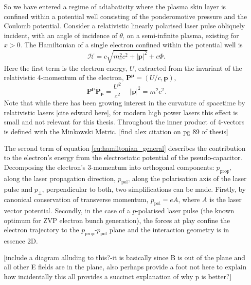 So we have entered a regime of adiabaticity where the plasma skin layer is confined within a potential well consisting of the ponderomotive pressure and the Coulomb potential. Consider a relativistic linearly polarised laser pulse obliquely incident, with an angle of incidence of $\theta$, on a semi-infinite plasma, existing for $x>0$. The Hamiltonian of a single electron confined within the potential well is
\begin{equation}\label{eq:hamiltonian_general}
	\mathcal{H} = c\sqrt{m^2_ec^2 + |\mathbf{p}|^2} + e\Phi.
\end{equation}
Here the first term is the electron energy, $U$, extracted from the invariant of the relativistic 4-momentum of the electron, $\mathbf{P^\mu} = (U/c, \mathbf{p})$,
\begin{equation}
	\mathbf{P^\mu \dot P_\mu} = \frac{U^2}{c^2} - |\mathbf{p}|^2 = m^2c^2.
\end{equation}
Note that while there has been growing interest in the curvature of spacetime by relativistic lasers [cite edward here], for modern high power lasers this effect is small and not relevant for this thesis. Throughout the inner product of 4-vectors is defined with the Minkowski Metric. [find alex citation on pg 89 of thesis]

The second term of equation \ref{eq:hamiltonian_general} describes the contribution to the electron's energy from the electrostatic potential of the pseudo-capacitor. Decomposing the electron's 3-momentum into orthogonal components: $p_\mathrm{prop}$, along the laser propagation direction, $p_\mathrm{pol}$, along the polarisation axis of the laser pulse and $p_\perp$, perpendicular to both, two simplifications can be made. Firstly, by canonical conservation of transverse momentum, $p_\mathrm{pol} = eA$, where $A$ is the laser vector potential. Secondly, in the case of a $p$-polarised laser pulse (the known optimum for ZVP electron bunch generation), the forces at play confine the electron trajectory to the  $p_\mathrm{prop}$-$p_\mathrm{pol}$ plane and the interaction geometry is in essence \ac{2D}.

[include a diagram alluding to this?-it is basically since B is out of the plane and all other E fields are in the plane, also perhaps provide a foot not here to explain how incidentally this all provides a succinct explanation of why p is better?]

